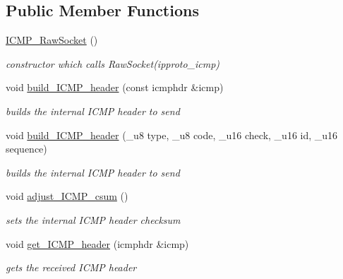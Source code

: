 \subsection*{Public Member Functions}
\begin{CompactItemize}
\item 
\hypertarget{classsocketpp_1_1ICMP__RawSocket_bed3b5ca33a0f7b4be42a9e6167266c0}{
\hyperlink{classsocketpp_1_1ICMP__RawSocket_bed3b5ca33a0f7b4be42a9e6167266c0}{ICMP\_\-RawSocket} ()}
\label{classsocketpp_1_1ICMP__RawSocket_bed3b5ca33a0f7b4be42a9e6167266c0}

\begin{CompactList}\small\item\em constructor which calls RawSocket(ipproto\_\-icmp) \item\end{CompactList}\item 
void \hyperlink{classsocketpp_1_1ICMP__RawSocket_7d8d54d4771f4012246835819421fbeb}{build\_\-ICMP\_\-header} (const icmphdr \&icmp)
\begin{CompactList}\small\item\em builds the internal ICMP header to send \item\end{CompactList}\item 
\hypertarget{classsocketpp_1_1ICMP__RawSocket_d97b59bf0442ecd08b3660cafd2a5a3f}{
void \hyperlink{classsocketpp_1_1ICMP__RawSocket_d97b59bf0442ecd08b3660cafd2a5a3f}{build\_\-ICMP\_\-header} (\_\-u8 type, \_\-u8 code, \_\-u16 check, \_\-u16 id, \_\-u16 sequence)}
\label{classsocketpp_1_1ICMP__RawSocket_d97b59bf0442ecd08b3660cafd2a5a3f}

\begin{CompactList}\small\item\em builds the internal ICMP header to send \item\end{CompactList}\item 
\hypertarget{classsocketpp_1_1ICMP__RawSocket_ab00bba6ed9fe98ca771fc3310983c97}{
void \hyperlink{classsocketpp_1_1ICMP__RawSocket_ab00bba6ed9fe98ca771fc3310983c97}{adjust\_\-ICMP\_\-csum} ()}
\label{classsocketpp_1_1ICMP__RawSocket_ab00bba6ed9fe98ca771fc3310983c97}

\begin{CompactList}\small\item\em sets the internal ICMP header checksum \item\end{CompactList}\item 
void \hyperlink{classsocketpp_1_1ICMP__RawSocket_9b0ed9bb87d2895f2302db13b7ca5f06}{get\_\-ICMP\_\-header} (icmphdr \&icmp)
\begin{CompactList}\small\item\em gets the received ICMP header \item\end{CompactList}\end{CompactItemize}
